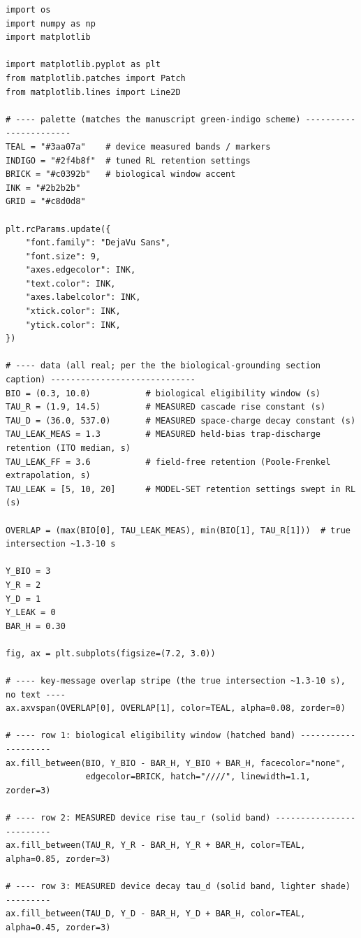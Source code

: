 \begin{lstlisting}[caption={schematics.ipynb code cell 11},label={lst:mrl-nb-schematics-11}]
import os
import numpy as np
import matplotlib

import matplotlib.pyplot as plt
from matplotlib.patches import Patch
from matplotlib.lines import Line2D

# ---- palette (matches the manuscript green-indigo scheme) -----------------------
TEAL = "#3aa07a"    # device measured bands / markers
INDIGO = "#2f4b8f"  # tuned RL retention settings
BRICK = "#c0392b"   # biological window accent
INK = "#2b2b2b"
GRID = "#c8d0d8"

plt.rcParams.update({
    "font.family": "DejaVu Sans",
    "font.size": 9,
    "axes.edgecolor": INK,
    "text.color": INK,
    "axes.labelcolor": INK,
    "xtick.color": INK,
    "ytick.color": INK,
})

# ---- data (all real; per the the biological-grounding section caption) -----------------------------
BIO = (0.3, 10.0)           # biological eligibility window (s)
TAU_R = (1.9, 14.5)         # MEASURED cascade rise constant (s)
TAU_D = (36.0, 537.0)       # MEASURED space-charge decay constant (s)
TAU_LEAK_MEAS = 1.3         # MEASURED held-bias trap-discharge retention (ITO median, s)
TAU_LEAK_FF = 3.6           # field-free retention (Poole-Frenkel extrapolation, s)
TAU_LEAK = [5, 10, 20]      # MODEL-SET retention settings swept in RL (s)

OVERLAP = (max(BIO[0], TAU_LEAK_MEAS), min(BIO[1], TAU_R[1]))  # true intersection ~1.3-10 s

Y_BIO = 3
Y_R = 2
Y_D = 1
Y_LEAK = 0
BAR_H = 0.30

fig, ax = plt.subplots(figsize=(7.2, 3.0))

# ---- key-message overlap stripe (the true intersection ~1.3-10 s), no text ----
ax.axvspan(OVERLAP[0], OVERLAP[1], color=TEAL, alpha=0.08, zorder=0)

# ---- row 1: biological eligibility window (hatched band) --------------------
ax.fill_between(BIO, Y_BIO - BAR_H, Y_BIO + BAR_H, facecolor="none",
                edgecolor=BRICK, hatch="////", linewidth=1.1, zorder=3)

# ---- row 2: MEASURED device rise tau_r (solid band) -------------------------
ax.fill_between(TAU_R, Y_R - BAR_H, Y_R + BAR_H, color=TEAL, alpha=0.85, zorder=3)

# ---- row 3: MEASURED device decay tau_d (solid band, lighter shade) ---------
ax.fill_between(TAU_D, Y_D - BAR_H, Y_D + BAR_H, color=TEAL, alpha=0.45, zorder=3)


\end{lstlisting}
